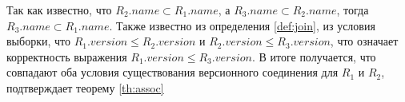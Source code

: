 \indent Так как известно, что $R_2.name \subset R_1.name$, а $R_3.name \subset R_2.name$, тогда $R_3.name \subset R_1.name$.
Также известно из определения \ref{def:join}, из условия выборки, что $R_1.version \leq R_2.version$ и $R_2.version \leq R_3.version$, что означает корректность выражения $R_1.version \leq R_3.version$.
В итоге получается, что совпадают оба условия существования версионного соединения для $R_1$ и $R_2$, подтверждает теорему \ref{th:assoc}






